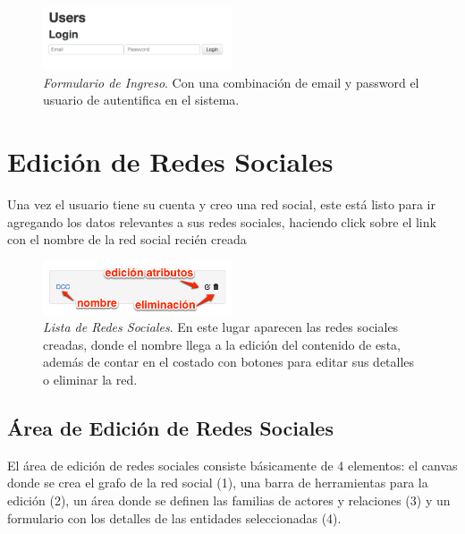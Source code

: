 \begin{figure}[H]
  \centering
  \includegraphics[width=0.5\textwidth]{images/login.png}
  \caption[Formulario de Ingreso]{\emph{Formulario de Ingreso}. Con una combinación de email y password el usuario de autentifica en el sistema.}
  \label{login}
\end{figure}



\section{Edición de Redes Sociales} %
\label{sec:edicion_de_redes_sociales}

Una vez el usuario tiene su cuenta y creo una red social, este está listo para ir agregando los datos relevantes a sus redes sociales, haciendo click sobre el link con el nombre de la red social recién creada

\begin{figure}[H]
  \centering
  \includegraphics[width=0.5\textwidth]{images/lista_redes_sociales.png}
  \caption[Lista de Redes Sociales]{\emph{Lista de Redes Sociales}. En este lugar aparecen las redes sociales creadas, donde el nombre llega a la edición del contenido de esta, además de contar en el costado con botones para editar sus detalles o eliminar la red.}
  \label{lista_redes_sociales}
\end{figure}

\subsection{Área de Edición de Redes Sociales} %
\label{sub:area_de_edicion_de_redes_sociales}

El área de edición de redes sociales consiste básicamente de 4 elementos: el canvas donde se crea el grafo de la red social (1), una barra de herramientas para la edición (2), un área donde se definen las familias de actores y relaciones (3) y un formulario con los detalles de las entidades seleccionadas (4).

